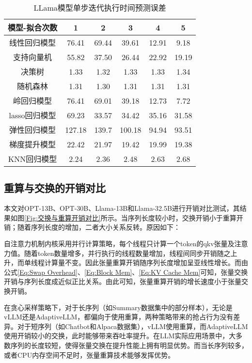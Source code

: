 \begin{table}[H]
  \centering
  \caption{LLama模型单步迭代执行时间预测误差}
  \label{Table:LLama模型单步迭代执行时间预测误差}
  \renewcommand{\arraystretch}{1.17}
  \small
  \begin{tabular}{c c c c c c}
    \toprule
    \textbf{模型-拟合次数} & \textbf{1} & \textbf{2} & \textbf{3} & \textbf{4} & \textbf{5} \\
    \midrule
    线性回归模型 & 76.41 & 69.44 & 39.61 & 12.91 & 9.18 \\ 
    支持向量机 & 55.82 & 37.50 & 26.44 & 22.92 & 19.19 \\ 
    决策树 & 1.33 & 1.32 & 1.33 & 1.33 & 1.34 \\ 
    随机森林 & 1.31 & 1.30 & 1.31 & 1.31 & 1.31 \\ 
    岭回归模型 & 76.41 & 69.01 & 39.18 & 12.73 & 7.72 \\ 
    lasso回归模型 & 69.23 & 33.57 & 34.42 & 35.16 & 31.58  \\ 
    弹性回归模型 & 127.18 & 139.7 & 100.18 & 94.94 & 93.51  \\ 
    梯度提升模型 & 22.42 & 21.97 & 19.42 & 19.99 & 19.38  \\ 
    KNN回归模型 & 2.24 & 2.36 & 2.48 & 2.63 & 2.68 \\ 
    \bottomrule
  \end{tabular}
\end{table}

\subsection{重算与交换的开销对比}
本文对OPT-13B、OPT-30B、Llama-13B和Llama-32.5B进行开销对比测试，其结果如图\ref{Fig:交换与重算开销对比}所示。当序列长度较小时，交换开销小于重算开销；随着序列长度的增加，二者大小关系反转。原因如下： 
\par
自注意力机制内核采用并行计算策略，每个线程只计算一个token的qkv张量及注意力值。随着token数量增多，并行执行的线程数量增加，线程间同步开销随之上升，而单线程计算量不变。因此张量重算开销随序列长度增加呈亚线性增长。而由公式\ref{Eq:Swap Overhead}、\ref{Eq:Block Mem}、\ref{Eq:KV Cache Mem}可知，张量交换开销与序列长度成近似正比关系。由此可知，张量重算开销的增长速度小于张量交换开销。 
\par
在贪心采样策略下，对于长序列（如Summary数据集中的部分样本），无论是vLLM还是AdaptiveLLM，都偏向于使用重算，两种策略带来的抢占行为没有差异。对于短序列（如Chatbot和Alpaca数据集），vLLM使用重算，而AdaptiveLLM使用开销较小的交换，此时能够带来吞吐率提升。在LLM实际应用场景中，大多数序列的长度较短，使得张量交换在提升性能上拥有明显优势。而当长序列较多，或者CPU内存空间不足时，张量重算技术能够发挥优势。 

